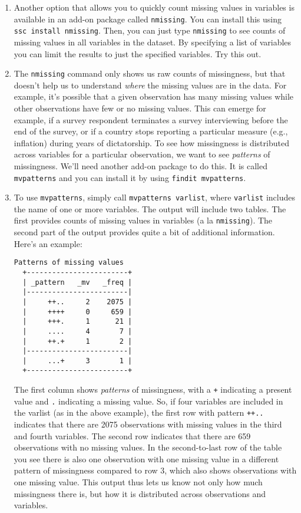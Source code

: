 \documentclass[a4paper,12pt]{article}
\begin{document}
\begin{enumerate}
\item Another option that allows you to quickly count missing values in variables is available in an add-on package called \texttt{nmissing}. You can install this using \texttt{ssc install nmissing}. Then, you can just type \texttt{nmissing} to see counts of missing values in all variables in the dataset. By specifying a list of variables you can limit the results to just the specified variables. Try this out.

\item The \texttt{nmissing} command only shows us raw counts of missingness, but that doesn't help us to understand {\em where} the missing values are in the data. For example, it's possible that a given observation has many missing values while other observations have few or no missing values. This can emerge for example, if a survey respondent terminates a survey interviewing before the end of the survey, or if a country stops reporting a particular measure (e.g., inflation) during years of dictatorship. To see how missingness is distributed across variables for a particular observation, we want to see {\em patterns} of missingness. We'll need another add-on package to do this. It is called \texttt{mvpatterns} and you can install it by using \texttt{findit mvpatterns}.


\item To use \texttt{mvpatterns}, simply call \texttt{mvpatterns varlist}, where \texttt{varlist} includes the name of one or more variables. The output will include two tables. The first provides counts of missing values in variables (a la \texttt{nmissing}). The second part of the output provides quite a bit of additional information. Here's an example:

\begin{verbatim}
Patterns of missing values
  +------------------------+
  | _pattern   _mv   _freq |
  |------------------------|
  |     ++..     2    2075 |
  |     ++++     0     659 |
  |     +++.     1      21 |
  |     ....     4       7 |
  |     ++.+     1       2 |
  |------------------------|
  |     ...+     3       1 |
  +------------------------+
\end{verbatim}

The first column shows {\em patterns} of missingness, with a \texttt{+} indicating a present value and \texttt{.} indicating a missing value. So, if four variables are included in the varlist (as in the above example), the first row with pattern \texttt{++..} indicates that there are 2075 observations with missing values in the third and fourth variables. The second row indicates that there are 659 observations with no missing values. In the second-to-last row of the table you see there is also one observation with one missing value in a different pattern of missingness compared to row 3, which also shows observations with one missing value. This output thus lets us know not only how much missingness there is, but how it is distributed across observations and variables.


\end{enumerate}
\end{document}
